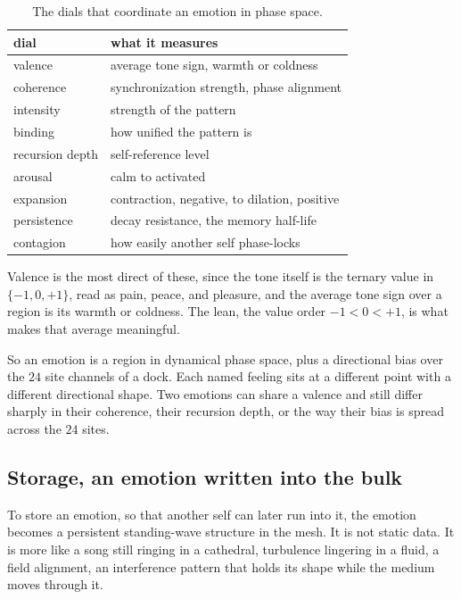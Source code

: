 \begin{table}[ht]
\centering
\begin{tabular}{@{}ll@{}}
\toprule
dial & what it measures \\
\midrule
valence & average tone sign, warmth or coldness \\
coherence & synchronization strength, phase alignment \\
intensity & strength of the pattern \\
binding & how unified the pattern is \\
recursion depth & self-reference level \\
arousal & calm to activated \\
expansion & contraction, negative, to dilation, positive \\
persistence & decay resistance, the memory half-life \\
contagion & how easily another self phase-locks \\
\bottomrule
\end{tabular}
\caption{The dials that coordinate an emotion in phase space.}
\label{tab:emotion-dials}
\end{table}

Valence is the most direct of these, since the tone itself is the ternary value in $\{-1, 0, +1\}$, read as pain, peace, and pleasure, and the average tone sign over a region is its warmth or coldness. The lean, the value order $-1 < 0 < +1$, is what makes that average meaningful.

So an emotion is a region in dynamical phase space, plus a directional bias over the $24$ site channels of a dock. Each named feeling sits at a different point with a different directional shape. Two emotions can share a valence and still differ sharply in their coherence, their recursion depth, or the way their bias is spread across the $24$ sites.

\subsection{Storage, an emotion written into the bulk}

To store an emotion, so that another self can later run into it, the emotion becomes a persistent standing-wave structure in the mesh. It is not static data. It is more like a song still ringing in a cathedral, turbulence lingering in a fluid, a field alignment, an interference pattern that holds its shape while the medium moves through it.

